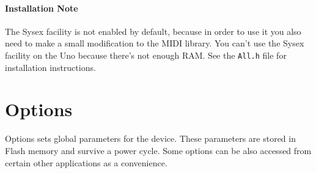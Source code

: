 \documentclass{article}
\begin{document}
\paragraph{Installation Note} The Sysex facility is not enabled by default, because in order to use it you also need to make a small modification to the MIDI library.  You can't use the Sysex facility on the Uno because there's not enough RAM.  See the {\tt All.h} file for installation instructions.

\clearpage
\section {Options}
\label{options}

	Options sets global parameters for the device.  These parameters are stored in Flash memory and survive a power cycle.  Some options can be also accessed from certain other applications as a convenience.  
	
\end{document}
